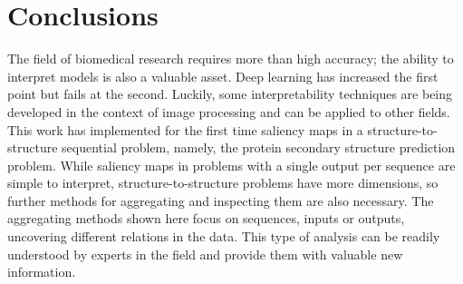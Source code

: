 \chapter{Conclusions} \label{Chapter: Conclusions}






The field of biomedical research requires more than high accuracy; the ability to interpret models is also a valuable asset. Deep learning has increased the first point but fails at the second. Luckily, some interpretability techniques are being developed in the context of image processing and can be applied to other fields. This work has implemented for the first time saliency maps in a structure-to-structure sequential problem, namely, the protein secondary structure prediction problem. While saliency maps in problems with a single output per sequence are simple to interpret, structure-to-structure problems have more dimensions, so further methods for aggregating and inspecting them are also necessary. The aggregating methods shown here focus on sequences, inputs or outputs, uncovering different relations in the data. This type of analysis can be readily understood by experts in the field and provide them with valuable new information.

